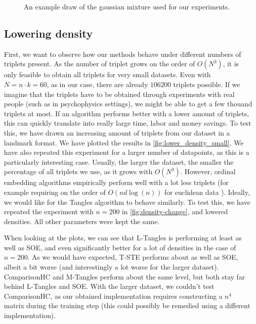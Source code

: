 \begin{figure}[h]
    \centering
    \resizebox{0.8\textwidth}{!}{}
    \caption{}
    \label{fig:dataset-gauss}
    \caption{An example draw of the gaussian mixture used for our experiments.}
\end{figure}

\subsection{Lowering density}\label{lower_density}
First, we want to observe how our methods behave under different numbers of triplets present. As the number of triplet grows on the order of $O(N^3)$, it is only feasible to obtain
all triplets for very small datasets. Even with $N = n \cdot k = 60$, as in our case, there are already $106200$ triplets possible. If we imagine that the triplets have to be obtained 
through experiments with real people (such as in psychophysics settings), we might be able to get a few thouand triplets at most. If an algorithm performs better with a lower amount
of triplets, this can quickly translate into really large time, labor and money savings. To test this, we have drawn an increasing amount of triplets from our dataset in a landmark format.
We have plotted the results in \autoref{fig:lower_density_small}. We have also repeated this experiment for a larger number of datapoints, as this is a particularly interesting case. 
Usually, the larger the dataset, the smaller the percentage of all triplets we use, as it grows with $O(N^3)$. However, ordinal embedding algorithms empirically perform well with a lot
less triplets (for example requiring on the order of $O(n d \log(n))$ for euclidean data \citep{jainFiniteSamplePrediction2016}). 
Ideally, we would like for the Tangles algorithm to behave similarly. To test this, we have repeated the experiment with $n=200$ in \autoref{fig:density-change}, and lowered densities.
All other parameters were kept the same.

When looking at the plots, we can see that L-Tangles is performing at least as well as SOE, and even significantly better for a lot of densities in the case of $n=200$. 
As we would have expected, T-STE performs about as well as SOE, albeit a bit worse (and interestingly a lot worse for the larger dataset). ComparisonHC and M-Tangles
perform about the same level, but both stay far behind L-Tangles and SOE. With the larger dataset, we couldn't test ComparisonHC, as our obtained implementation requires 
constructing a $n^4$ matrix during the training step (this could possibly be remedied using a different implementation).

